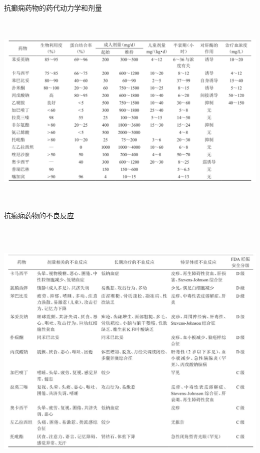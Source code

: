 \begin{table}[htbp]
\centering
\caption{抗癫痫药物的药代动力学和剂量}
\label{tab85-5}
\includegraphics[width=6.70833in,height=3.78125in]{./images/Image00388.jpg}
\end{table}

\begin{table}[htbp]
\centering
\caption{抗癫痫药物的不良反应}
\label{tab85-6}
\includegraphics[width=6.63542in,height=5.14583in]{./images/Image00389.jpg}
\end{table}

